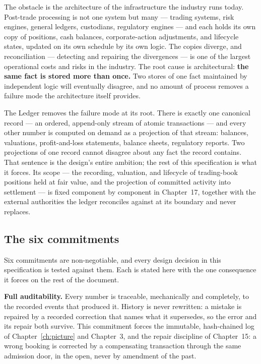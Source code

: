 The obstacle is the architecture of the infrastructure the industry runs today.
Post-trade processing is not one system but many --- trading systems, risk engines,
general ledgers, custodians, regulatory engines --- and each holds its own copy of
positions, cash balances, corporate-action adjustments, and lifecycle states, updated
on its own schedule by its own logic. The copies diverge, and reconciliation ---
detecting and repairing the divergences --- is one of the largest operational costs
and risks in the industry. The root cause is architectural: \textbf{the same fact is
stored more than once.} Two stores of one fact maintained by independent logic will
eventually disagree, and no amount of process removes a failure mode the architecture
itself provides.

The Ledger removes the failure mode at its root. There is exactly one canonical record
--- an ordered, append-only stream of atomic transactions --- and every other number
is computed on demand as a projection of that stream: balances, valuations,
profit-and-loss statements, balance sheets, regulatory reports. Two projections of one
record cannot disagree about any fact the record contains. That sentence is the
design's entire ambition; the rest of this specification is what it forces. Its scope
--- the recording, valuation, and lifecycle of trading-book positions held at fair
value, and the projection of committed activity into settlement --- is fixed
component by component in Chapter~17, together with the external authorities the
ledger reconciles against at its boundary and never replaces.

\subsection{The six commitments}

Six commitments are non-negotiable, and every design decision in this specification is
tested against them. Each is stated here with the one consequence it forces on the
rest of the document.

\textbf{Full auditability.} Every number is traceable, mechanically and completely, to
the recorded events that produced it. History is never rewritten: a mistake is
repaired by a recorded correction that names what it supersedes, so the error and its
repair both survive. This commitment forces the immutable, hash-chained log of
Chapter~\ref{ch:picture} and Chapter~3, and the repair discipline of Chapter~15: a
wrong booking is corrected by a compensating transaction through the same admission
door, in the open, never by amendment of the past.

